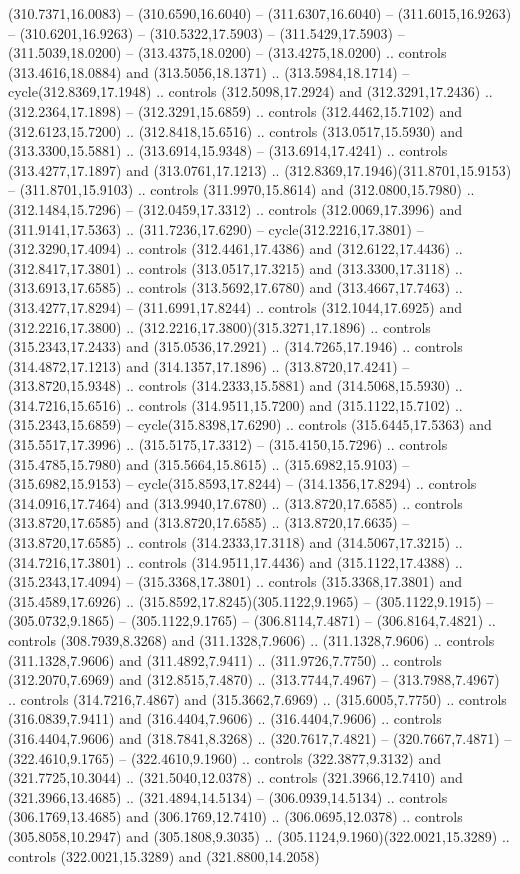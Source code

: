 (310.7371,16.0083) -- (310.6590,16.6040) -- (311.6307,16.6040) -- (311.6015,16.9263) -- (310.6201,16.9263) -- (310.5322,17.5903) -- (311.5429,17.5903) -- (311.5039,18.0200) -- (313.4375,18.0200) -- (313.4275,18.0200) .. controls (313.4616,18.0884) and (313.5056,18.1371) .. (313.5984,18.1714) -- cycle(312.8369,17.1948) .. controls (312.5098,17.2924) and (312.3291,17.2436) .. (312.2364,17.1898) -- (312.3291,15.6859) .. controls (312.4462,15.7102) and (312.6123,15.7200) .. (312.8418,15.6516) .. controls (313.0517,15.5930) and (313.3300,15.5881) .. (313.6914,15.9348) -- (313.6914,17.4241) .. controls (313.4277,17.1897) and (313.0761,17.1213) .. (312.8369,17.1946)(311.8701,15.9153) -- (311.8701,15.9103) .. controls (311.9970,15.8614) and (312.0800,15.7980) .. (312.1484,15.7296) -- (312.0459,17.3312) .. controls (312.0069,17.3996) and (311.9141,17.5363) .. (311.7236,17.6290) -- cycle(312.2216,17.3801) -- (312.3290,17.4094) .. controls (312.4461,17.4386) and (312.6122,17.4436) .. (312.8417,17.3801) .. controls (313.0517,17.3215) and (313.3300,17.3118) .. (313.6913,17.6585) .. controls (313.5692,17.6780) and (313.4667,17.7463) .. (313.4277,17.8294) -- (311.6991,17.8244) .. controls (312.1044,17.6925) and (312.2216,17.3800) .. (312.2216,17.3800)(315.3271,17.1896) .. controls (315.2343,17.2433) and (315.0536,17.2921) .. (314.7265,17.1946) .. controls (314.4872,17.1213) and (314.1357,17.1896) .. (313.8720,17.4241) -- (313.8720,15.9348) .. controls (314.2333,15.5881) and (314.5068,15.5930) .. (314.7216,15.6516) .. controls (314.9511,15.7200) and (315.1122,15.7102) .. (315.2343,15.6859) -- cycle(315.8398,17.6290) .. controls (315.6445,17.5363) and (315.5517,17.3996) .. (315.5175,17.3312) -- (315.4150,15.7296) .. controls (315.4785,15.7980) and (315.5664,15.8615) .. (315.6982,15.9103) -- (315.6982,15.9153) -- cycle(315.8593,17.8244) -- (314.1356,17.8294) .. controls (314.0916,17.7464) and (313.9940,17.6780) .. (313.8720,17.6585) .. controls (313.8720,17.6585) and (313.8720,17.6585) .. (313.8720,17.6635) -- (313.8720,17.6585) .. controls (314.2333,17.3118) and (314.5067,17.3215) .. (314.7216,17.3801) .. controls (314.9511,17.4436) and (315.1122,17.4388) .. (315.2343,17.4094) -- (315.3368,17.3801) .. controls (315.3368,17.3801) and (315.4589,17.6926) .. (315.8592,17.8245)(305.1122,9.1965) -- (305.1122,9.1915) -- (305.0732,9.1865) -- (305.1122,9.1765) -- (306.8114,7.4871) -- (306.8164,7.4821) .. controls (308.7939,8.3268) and (311.1328,7.9606) .. (311.1328,7.9606) .. controls (311.1328,7.9606) and (311.4892,7.9411) .. (311.9726,7.7750) .. controls (312.2070,7.6969) and (312.8515,7.4870) .. (313.7744,7.4967) -- (313.7988,7.4967) .. controls (314.7216,7.4867) and (315.3662,7.6969) .. (315.6005,7.7750) .. controls (316.0839,7.9411) and (316.4404,7.9606) .. (316.4404,7.9606) .. controls (316.4404,7.9606) and (318.7841,8.3268) .. (320.7617,7.4821) -- (320.7667,7.4871) -- (322.4610,9.1765) -- (322.4610,9.1960) .. controls (322.3877,9.3132) and (321.7725,10.3044) .. (321.5040,12.0378) .. controls (321.3966,12.7410) and (321.3966,13.4685) .. (321.4894,14.5134) -- (306.0939,14.5134) .. controls (306.1769,13.4685) and (306.1769,12.7410) .. (306.0695,12.0378) .. controls (305.8058,10.2947) and (305.1808,9.3035) .. (305.1124,9.1960)(322.0021,15.3289) .. controls (322.0021,15.3289) and (321.8800,14.2058) 
